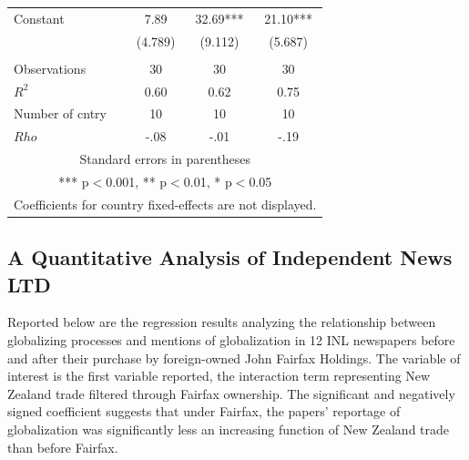 \documentclass[12pt]{report}
\begin{document}
\begin{table}[htdp]
\begin{center}
{\begin{tabular}{lccc}
Constant & 7.89 & 32.69*** & 21.10*** \\  & (4.789) &
(9.112) & (5.687) \\
 &  &  &
 \\ Observations & 30 & 30 & 30 \\ $R^2$ & 0.60 & 0.62 & 0.75
\\ Number of cntry & 10 & 10 & 10 \\  $Rho$ & -.08 & -.01 & -.19 \\ \hline
\multicolumn{4}{c}{ Standard errors in parentheses} \\
\multicolumn{4}{c}{ *** p$<$0.001, ** p$<$0.01, * p$<$0.05} \\
\multicolumn{4}{c}{ Coefficients for country fixed-effects are not displayed.
} \\ \end{tabular}
} \end{center}
\label{default}
\end{table}

\pagebreak

\subsection{A Quantitative Analysis of Independent News LTD} Reported below are the regression
results analyzing the relationship between globalizing processes and mentions of globalization in 12
INL newspapers before and after their purchase by foreign-owned John Fairfax Holdings. The variable
of interest is the first variable reported, the interaction term representing New Zealand trade
filtered through Fairfax ownership. The significant and negatively signed coefficient suggests that
under Fairfax, the papers' reportage of globalization was significantly less an increasing function
of New Zealand trade than before Fairfax.
\end{document}
